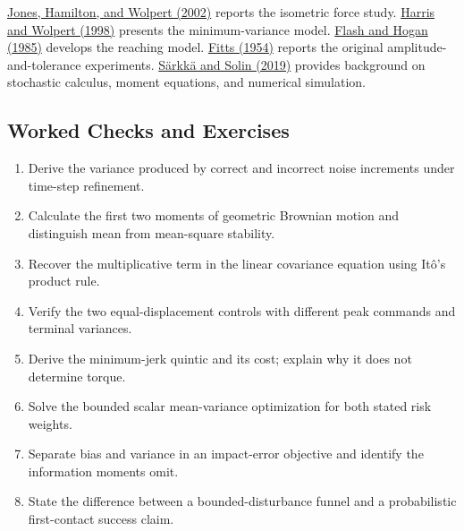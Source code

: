 \documentclass[12pt, openany]{book}
\theoremstyle{plain}
\begin{document}
\href{https://wolpertlab.neuroscience.columbia.edu/sites/default/files/content/papers/JonHamWol02.pdf}{Jones, Hamilton, and Wolpert (2002)} reports the isometric force study.
\href{https://wolpertlab.neuroscience.columbia.edu/sites/default/files/content/papers/HarWol98.pdf}{Harris and Wolpert (1998)} presents the minimum-variance model.
\href{https://pubmed.ncbi.nlm.nih.gov/4020415/}{Flash and Hogan (1985)} develops the reaching model.
\href{https://doi.org/10.1037/h0055392}{Fitts (1954)} reports the original amplitude-and-tolerance experiments.
\href{https://users.aalto.fi/~ssarkka/pub/sde_book.pdf}{Särkkä and Solin (2019)} provides background on stochastic calculus, moment equations, and numerical simulation.

\begin{samepage}
\section{Worked Checks and Exercises}

\begin{enumerate}[itemsep=0.25em,parsep=0pt]
\item Derive the variance produced by correct and incorrect noise increments under time-step refinement.
\item Calculate the first two moments of geometric Brownian motion and distinguish mean from mean-square stability.
\item Recover the multiplicative term in the linear covariance equation using Itô's product rule.
\item Verify the two equal-displacement controls with different peak commands and terminal variances.
\item Derive the minimum-jerk quintic and its cost; explain why it does not determine torque.
\item Solve the bounded scalar mean-variance optimization for both stated risk weights.
\item Separate bias and variance in an impact-error objective and identify the information moments omit.
\item State the difference between a bounded-disturbance funnel and a probabilistic first-contact success claim.
\end{enumerate}
\end{samepage}
\end{document}
